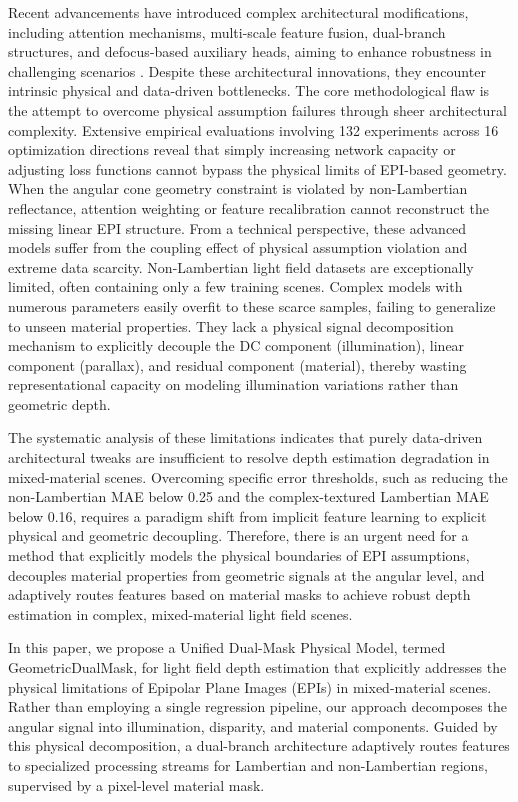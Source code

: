 \documentclass[lettersize,journal]{IEEEtran}
\begin{document}
Recent advancements have introduced complex architectural modifications, including attention mechanisms, multi-scale feature fusion, dual-branch structures, and defocus-based auxiliary heads, aiming to enhance robustness in challenging scenarios . Despite these architectural innovations, they encounter intrinsic physical and data-driven bottlenecks. The core methodological flaw is the attempt to overcome physical assumption failures through sheer architectural complexity. Extensive empirical evaluations involving 132 experiments across 16 optimization directions reveal that simply increasing network capacity or adjusting loss functions cannot bypass the physical limits of EPI-based geometry. When the angular cone geometry constraint is violated by non-Lambertian reflectance, attention weighting or feature recalibration cannot reconstruct the missing linear EPI structure. From a technical perspective, these advanced models suffer from the coupling effect of physical assumption violation and extreme data scarcity. Non-Lambertian light field datasets are exceptionally limited, often containing only a few training scenes. Complex models with numerous parameters easily overfit to these scarce samples, failing to generalize to unseen material properties. They lack a physical signal decomposition mechanism to explicitly decouple the DC component (illumination), linear component (parallax), and residual component (material), thereby wasting representational capacity on modeling illumination variations rather than geometric depth.

The systematic analysis of these limitations indicates that purely data-driven architectural tweaks are insufficient to resolve depth estimation degradation in mixed-material scenes. Overcoming specific error thresholds, such as reducing the non-Lambertian MAE below 0.25 and the complex-textured Lambertian MAE below 0.16, requires a paradigm shift from implicit feature learning to explicit physical and geometric decoupling. Therefore, there is an urgent need for a method that explicitly models the physical boundaries of EPI assumptions, decouples material properties from geometric signals at the angular level, and adaptively routes features based on material masks to achieve robust depth estimation in complex, mixed-material light field scenes.

In this paper, we propose a Unified Dual-Mask Physical Model, termed GeometricDualMask, for light field depth estimation that explicitly addresses the physical limitations of Epipolar Plane Images (EPIs) in mixed-material scenes. Rather than employing a single regression pipeline, our approach decomposes the angular signal into illumination, disparity, and material components. Guided by this physical decomposition, a dual-branch architecture adaptively routes features to specialized processing streams for Lambertian and non-Lambertian regions, supervised by a pixel-level material mask.
\end{document}
